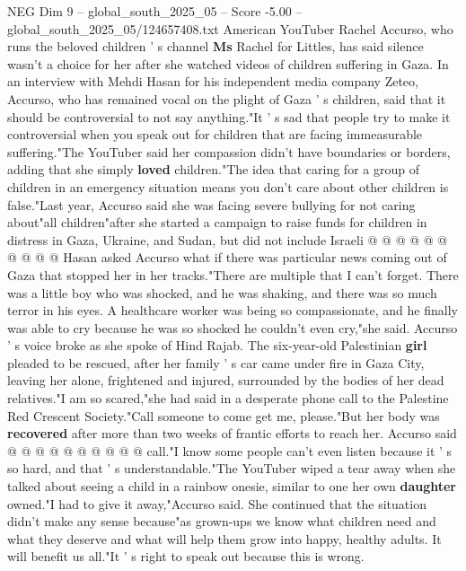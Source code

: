 \begin{textsample}{NEG Dim 9 – global\_south\_2025\_05 – Score -5.00 – global\_south\_2025\_05/124657408.txt}  \label{ex:f9_neg_227}
American YouTuber Rachel Accurso, who runs the beloved children ' s channel \textbf{Ms} Rachel for Littles, has said silence wasn't a choice for her after she watched videos of children suffering in Gaza.
In an interview with Mehdi Hasan for his independent media company Zeteo, Accurso, who has remained vocal on the plight of Gaza ' s children, said that it should be controversial to not say anything."It ' s sad that people try to make it controversial when you speak out for children that are facing immeasurable suffering."The YouTuber said her compassion didn't have boundaries or borders, adding that she simply \textbf{loved} children."The idea that caring for a group of children in an emergency situation means you don't care about other children is false."Last year, Accurso said she was facing severe bullying for not caring about"all children"after she started a campaign to raise funds for children in distress in Gaza, Ukraine, and Sudan, but did not include Israeli @ @ @ @ @ @ @ @ @ @ Hasan asked Accurso what if there was particular news coming out of Gaza that stopped her in her tracks."There are multiple that I can't forget.
There was a little boy who was shocked, and he was shaking, and there was so much terror in his eyes.
A healthcare worker was being so compassionate, and he finally was able to cry because he was so shocked he couldn't even cry,"she said.
Accurso ' s voice broke as she spoke of Hind Rajab.
The six-year-old Palestinian \textbf{girl} pleaded to be rescued, after her family ' s car came under fire in Gaza City, leaving her alone, frightened and injured, surrounded by the bodies of her dead relatives."I am so scared,"she had said in a desperate phone call to the Palestine Red Crescent Society."Call someone to come get me, please."But her body was \textbf{recovered} after more than two weeks of frantic efforts to reach her.
Accurso said @ @ @ @ @ @ @ @ @ @ call."I know some people can't even listen because it ' s so hard, and that ' s understandable."The YouTuber wiped a tear away when she talked about seeing a child in a rainbow onesie, similar to one her own \textbf{daughter} owned."I had to give it away,"Accurso said.
She continued that the situation didn't make any sense because"as grown-ups we know what children need and what they deserve and what will help them grow into happy, healthy adults.
It will benefit us all."It ' s right to speak out because this is wrong.

\end{textsample}
